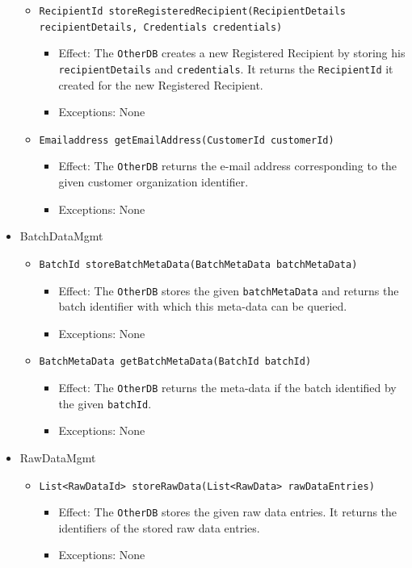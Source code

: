 \documentclass[a4paper,10pt]{article}
\begin{document}
\begin{itemize}
\begin{itemize}
		\item \texttt{RecipientId storeRegisteredRecipient(RecipientDetails recipientDetails, Credentials credentials)}    
        \begin{itemize}
            \item Effect: The \texttt{OtherDB} creates a new 
            Registered Recipient by storing his \texttt{recipientDetails} and \texttt{credentials}. It returns the \texttt{RecipientId} it created for the new Registered Recipient.
            \item Exceptions: None	
		\end{itemize}

		\item \texttt{Emailaddress getEmailAddress(CustomerId customerId)}    
        \begin{itemize}
            \item Effect: The \texttt{OtherDB} returns the e-mail address corresponding to the given customer organization identifier.
            \item Exceptions: None	
		\end{itemize}
						  		    
    \end{itemize}
    
	\item BatchDataMgmt
    \begin{itemize}
        \item \texttt{BatchId storeBatchMetaData(BatchMetaData batchMetaData)}
        \begin{itemize}
            \item Effect: The \texttt{OtherDB} stores the given \texttt{batchMetaData} and returns the batch identifier with which this meta-data can be queried.
            \item Exceptions: None
        \end{itemize}
        
        \item \texttt{BatchMetaData getBatchMetaData(BatchId batchId)}
        \begin{itemize}
            \item Effect: The \texttt{OtherDB} returns the meta-data if the batch identified by the given \texttt{batchId}.
            \item Exceptions: None
        \end{itemize}
    \end{itemize}    
    
    	\item RawDataMgmt
    \begin{itemize}
        \item \texttt{List<RawDataId> storeRawData(List<RawData> rawDataEntries)}
        \begin{itemize}
            \item Effect: The \texttt{OtherDB} stores the given raw data entries. It returns the identifiers of the stored raw data entries.
            \item Exceptions: None
        \end{itemize}
        

\end{itemize}
\end{itemize}
\end{document}
